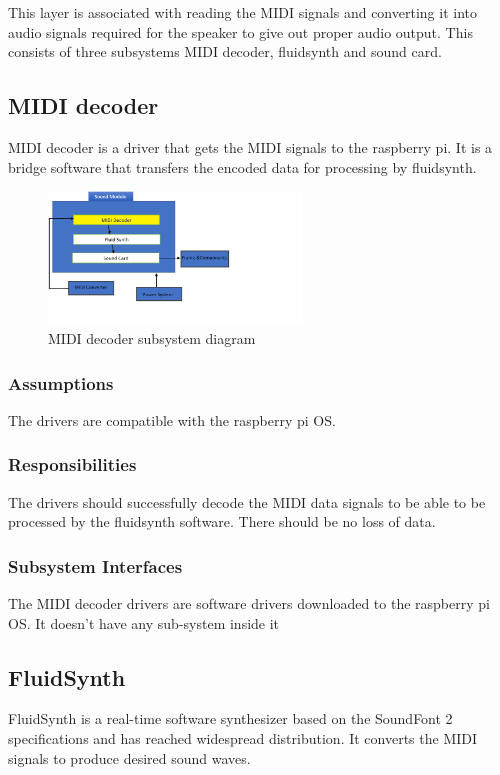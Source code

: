 This layer is associated with reading the MIDI signals and converting it into audio signals required for the speaker to give out proper audio output. This consists of three subsystems MIDI decoder, fluidsynth and sound card.

\subsection{MIDI decoder}
MIDI decoder is a driver that gets the MIDI signals to the raspberry pi. It is a bridge software that transfers the encoded data for processing by fluidsynth. 
\begin{figure}[h!]
	\centering
 	\includegraphics[width=0.60\textwidth]{images/MIDI_decoder}
 \caption{MIDI decoder subsystem diagram}
\end{figure}

\subsubsection{Assumptions}
The drivers are compatible with the raspberry pi OS. 

\subsubsection{Responsibilities}
The drivers should successfully decode the MIDI data signals to be able to be processed by the fluidsynth software. There should be no loss of data.

\subsubsection{Subsystem Interfaces}
The MIDI decoder drivers are software drivers downloaded to the raspberry pi OS. It doesn't have any sub-system inside it


\subsection{FluidSynth}
FluidSynth is a real-time software synthesizer based on the SoundFont 2 specifications and has reached widespread distribution. It converts the MIDI signals to produce desired sound waves.

